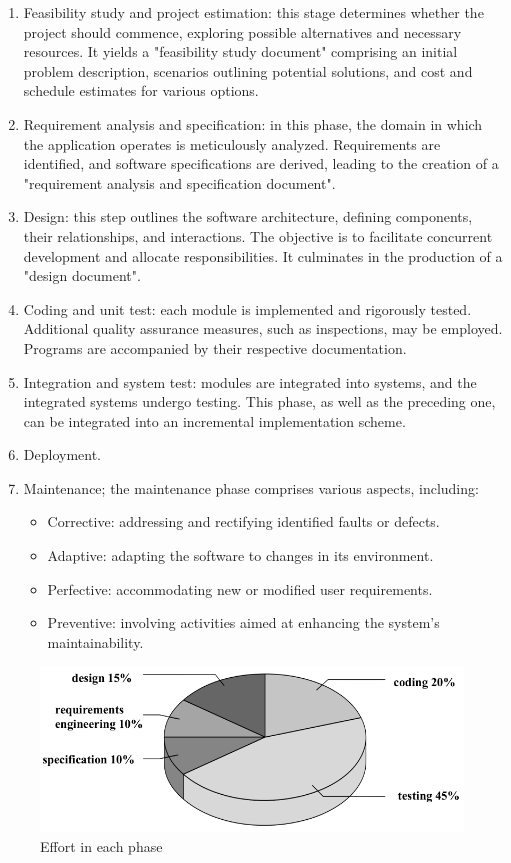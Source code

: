 \begin{enumerate}
    \item Feasibility study and project estimation: this stage determines whether the project should commence, exploring possible alternatives and necessary resources. 
        It yields a "feasibility study document" comprising an initial problem description, scenarios outlining potential solutions, and cost and schedule estimates for various options.
    \item Requirement analysis and specification: in this phase, the domain in which the application operates is meticulously analyzed. 
        Requirements are identified, and software specifications are derived, leading to the creation of a "requirement analysis and specification document". 
    \item Design: this step outlines the software architecture, defining components, their relationships, and interactions. 
        The objective is to facilitate concurrent development and allocate responsibilities. 
        It culminates in the production of a "design document". 
    \item Coding and unit test: each module is implemented and rigorously tested. 
        Additional quality assurance measures, such as inspections, may be employed. 
        Programs are accompanied by their respective documentation.
    \item Integration and system test: modules are integrated into systems, and the integrated systems undergo testing. 
        This phase, as well as the preceding one, can be integrated into an incremental implementation scheme.
    \item Deployment.
    \item Maintenance; the maintenance phase comprises various aspects, including:
        \begin{itemize}
            \item Corrective: addressing and rectifying identified faults or defects.
            \item Adaptive: adapting the software to changes in its environment.
            \item Perfective: accommodating new or modified user requirements.
            \item Preventive: involving activities aimed at enhancing the system's maintainability.
        \end{itemize}
\end{enumerate}
\begin{figure}[H]
    \centering
    \includegraphics[width=0.75\linewidth]{images/effort.png}
    \caption{Effort in each phase}
\end{figure}

